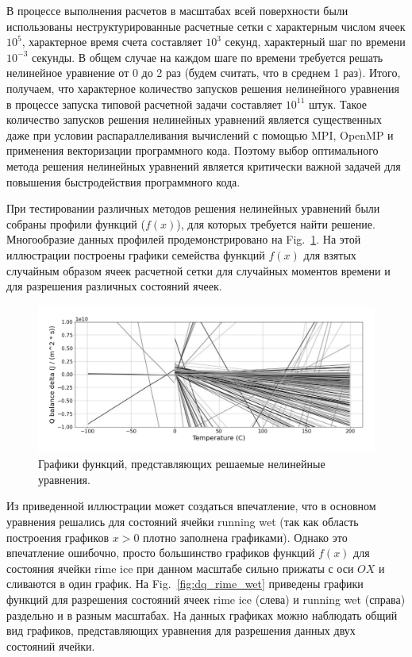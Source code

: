 \documentclass[
11pt,%
tightenlines,%
twoside,%
onecolumn,%
nofloats,%
nobibnotes,%
nofootinbib,%
superscriptaddress,%
noshowpacs,%
centertags]%
{revtex4}
\begin{document}
В процессе выполнения расчетов в масштабах всей поверхности были использованы неструктурированные расчетные сетки с характерным числом ячеек $10^5$, характерное время счета составляет $10^3$ секунд, характерный шаг по времени $10^{-3}$ секунды.
В общем случае на каждом шаге по времени требуется решать нелинейное уравнение от 0 до 2 раз (будем считать, что в среднем 1 раз).
Итого, получаем, что характерное количество запусков решения нелинейного уравнения в процессе запуска типовой расчетной задачи составляет $10^11$ штук.
Такое количество запусков решения нелинейных уравнений является существенных даже при условии распараллеливания вычислений с помощью MPI, OpenMP и применения векторизации программного кода.
Поэтому выбор оптимального метода решения нелинейных уравнений является критически важной задачей для повышения быстродействия программного кода.

При тестировании различных методов решения нелинейных уравнений были собраны профили функций ($f(x)$), для которых требуется найти решение.
Многообразие данных профилей продемонстрировано на Fig.~\ref{fig:dq}.
На этой иллюстрации построены графики семейства функций $f(x)$ для взятых случайным образом ячеек расчетной сетки для случайных моментов времени и для разрешения различных состояний ячеек.

\begin{figure}[h]
\setcaptionmargin{5mm}
\onelinecaptionstrue
\includegraphics[width=1.0\textwidth]{pics/dq.pdf}
\caption{Графики функций, представляющих решаемые нелинейные уравнения.}\label{fig:dq}
\end{figure}

Из приведенной иллюстрации может создаться впечатление, что в основном уравнения решались для состояний ячейки running wet (так как область построения графиков $x > 0$ плотно заполнена графиками).
Однако это впечатление ошибочно, просто большинство графиков функций $f(x)$ для состояния ячейки rime ice при данном масштабе сильно прижаты с оси $OX$ и сливаются в один график.
На Fig.~\ref{fig:dq_rime_wet} приведены графики функций для разрешения состояний ячеек rime ice (слева) и running wet (справа) раздельно и в разным масштабах.
На данных графиках можно наблюдать общий вид графиков, представляющих уравнения для разрешения данных двух состояний ячейки.
\end{document}
